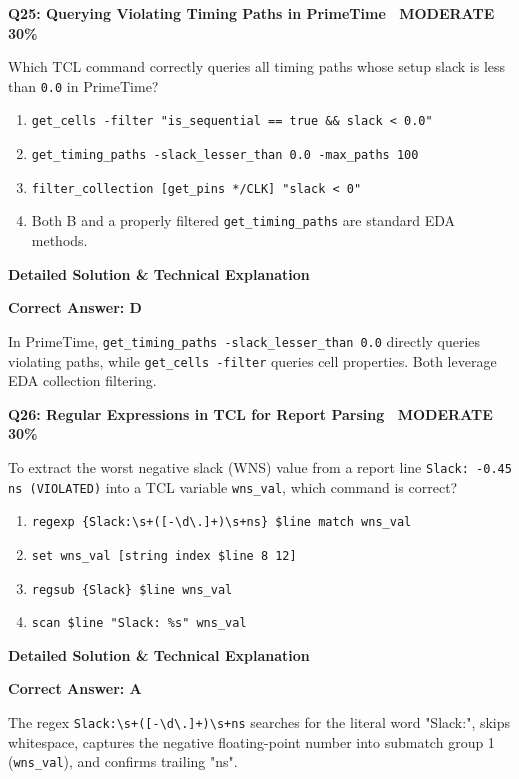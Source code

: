 \documentclass[11pt,a4paper]{article}
\newcommand{\badgemod}{{\color{white}\colorbox{modoran}{\bfseries\sffamily\tiny\ MODERATE 30\%\ }}}
\newenvironment{qbox}[2]{%
  \begin{mdframed}[style=qstyle]%
  {\bfseries\sffamily\color{primaryblue}#1 \hfill #2}\par\vspace{2pt}%
}{%
  \end{mdframed}%
}
\newenvironment{ansbox}{%
  \begin{mdframed}[style=ansstyle]%
  {\bfseries\sffamily\color{ansgreen}\small Detailed Solution \& Technical Explanation}\par\vspace{2pt}\small%
}{%
  \end{mdframed}%
}
\begin{document}
\begin{qbox}{Q25: Querying Violating Timing Paths in PrimeTime}{\badgemod}
Which TCL command correctly queries all timing paths whose setup slack is less than \texttt{0.0} in PrimeTime?
\begin{enumerate}[label=\textbf{\Alph*.}]
  \item \texttt{get\_cells -filter "is\_sequential == true \&\& slack < 0.0"}
  \item \texttt{get\_timing\_paths -slack\_lesser\_than 0.0 -max\_paths 100}
  \item \texttt{filter\_collection [get\_pins */CLK] "slack < 0"}
  \item Both B and a properly filtered \texttt{get\_timing\_paths} are standard EDA methods.
\end{enumerate}
\end{qbox}
\begin{ansbox}
\textbf{Correct Answer: D}

In PrimeTime, \texttt{get\_timing\_paths -slack\_lesser\_than 0.0} directly queries violating paths, while \texttt{get\_cells -filter} queries cell properties. Both leverage EDA collection filtering.
\end{ansbox}

\begin{qbox}{Q26: Regular Expressions in TCL for Report Parsing}{\badgemod}
To extract the worst negative slack (WNS) value from a report line \texttt{Slack: -0.45 ns (VIOLATED)} into a TCL variable \texttt{wns\_val}, which command is correct?
\begin{enumerate}[label=\textbf{\Alph*.}]
  \item \texttt{regexp \{Slack:\textbackslash s+([-\textbackslash d\textbackslash .]+)\textbackslash s+ns\} \$line match wns\_val}
  \item \texttt{set wns\_val [string index \$line 8 12]}
  \item \texttt{regsub \{Slack\} \$line wns\_val}
  \item \texttt{scan \$line "Slack: \%s" wns\_val}
\end{enumerate}
\end{qbox}
\begin{ansbox}
\textbf{Correct Answer: A}

The regex \texttt{Slack:\textbackslash s+([-\textbackslash d\textbackslash .]+)\textbackslash s+ns} searches for the literal word "Slack:", skips whitespace, captures the negative floating-point number into submatch group 1 (\texttt{wns\_val}), and confirms trailing "ns".
\end{ansbox}
\end{document}
